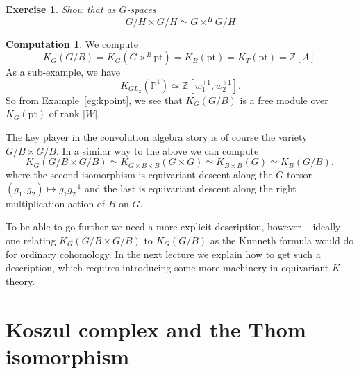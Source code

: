 \documentclass[11pt]{amsart}
\newtheorem{exercise}[dummy]{Exercise}
\theoremstyle{definition}
\newtheorem{computation}[dummy]{Computation}
\newcommand{\bP}{\mathbb{P}}
\newcommand{\bZ}{\mathbb{Z}}
\numberwithin{equation}{subsection}
\numberwithin{figure}{subsection}
\newcommand{\pt}{\mathrm{pt}}
\begin{document}
\begin{exercise}
\label{ex:small-model}
Show that as $G$-spaces
$$
G/H\times G/H \simeq G\times^HG/H
$$
\end{exercise}

\begin{computation} We compute 
$$
K_G(G/B)=K_G(G\times^B\pt)=K_B(\pt)=K_T(\pt)=\mathbb{Z}[\Lambda].
$$
As a sub-example, we have 
$$
K_{GL_2}(\bP^1) \simeq \bZ[w_1^{\pm1},w_2^{\pm1}].
$$
So from Example~\ref{eg:kpoint}, we see that $K_G(G/B)$ is a free module over $K_G(\pt)$ of rank $|W|$. 


The key player in the convolution algebra story is of course the variety $G/B\times G/B$.  
In a similar way to the above we can compute
$$
K_G(G/B\times G/B)\simeq K_{G\times B\times B}(G\times G)\simeq K_{ B\times B}(G)\simeq K_B(G/B),
$$
where the second isomorphism is equivariant descent along the $G$-torsor $(g_1,g_2)\mapsto g_1g_2^{-1}$ and the last is equivariant descent along the right multiplication action of $B$ on $G$.
\end{computation}
 To be able to go further we need a more explicit description, however -- ideally one relating $K_G(G/B\times G/B)$ to $K_G(G/B)$ as the Kunneth formula would do for ordinary cohomology.  In the next lecture we explain how to get such a description, which requires introducing some more machinery in equivariant $K$-theory.

\section{Koszul complex and the Thom isomorphism}
\end{document}
